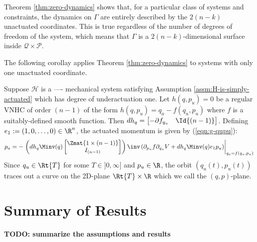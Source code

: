Theorem \ref{thm:zero-dynamics} shows that, for a particular class of systems
and constraints, the dynamics on \(\Gamma\) are entirely described by the \(2(n-k)\)
unactuated coordinates. 
This is true regardless of the number of degrees of freedom of the system, which
means that \(\Gamma\) is a \(2(n-k)\)-dimensional surface inside 
\(\mathcal{Q}\times \mathcal{P}\). 

The following corollay applies Theorem \ref{thm:zero-dynamics} to
systems with only one unactuated coordinate.

\begin{cor}\label{cor:2d-zero-dynamics}
    Suppose \(\mathcal{H}\) is a ---- mechanical system satisfying Assumption
    \ref{assm:H-is-simply-actuated} which has degree of underactuation one.
    Let \(h(q,p_u) = 0\) be a regular VNHC of order \((n-1)\) of the form
    \(h(q,p_u) = q_a - f(q_u,p_u)\)
    where \(f\) is a suitably-defined smooth function.
    Then \(dh_q = \begin{bmatrix} -\partial f_{q_u} & \Id{(n-1)}
    \end{bmatrix}\).
    Defining \(e_1 := (1,0,\ldots,0) \in \R^n\), the actuated momentum is given
    by (\ref{eqn:g-qupu}):
    \begin{equation}\label{eqn:g-qupu}
        p_a = -\left.\left(dh_q \Minv(q)
        \begin{bmatrix}
            \Zmat{1\times (n-1)}\\
            I_{(n-1)}
        \end{bmatrix}\right)\inv 
        \left(\partial_{p_u}f \partial_{q_u}V + dh_q \Minv(q)e_1 p_u\right) 
            \right|_{q_a =f(q_u,p_u)}
    \end{equation}
    Since \(q_u \in \Rt{T}\) for some \(T \in ]0,\infty]\) and \(p_u \in \R\),
    the orbit \((q_u(t),p_u(t))\) traces out
    a curve on the 2D-plane \(\Rt{T} \times \R\) which we call the \((q,p)\)-plane.
\end{cor}

\section{Summary of Results}
\textbf{TODO: summarize the assumptions and results }















